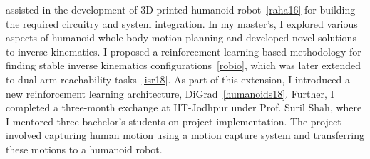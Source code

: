 \documentclass[11pt]{article}
\begin{document}
assisted in the development of 3D printed humanoid robot~\ref{raha16} for building the required circuitry and system integration. In my master’s, I explored various aspects of humanoid whole-body motion planning and developed novel solutions to inverse kinematics. I proposed a reinforcement learning-based methodology for finding stable inverse kinematics configurations~\ref{robio}, which was later extended to dual-arm reachability tasks~\ref{isr18}. As part of this extension, I introduced a new reinforcement learning architecture, DiGrad~\ref{humanoids18}. Further, I completed a three-month exchange at IIT-Jodhpur under Prof. Suril Shah, where I mentored three bachelor’s students on project implementation. The project involved capturing human motion using a motion capture system and transferring these motions to a humanoid robot.
\end{document}
